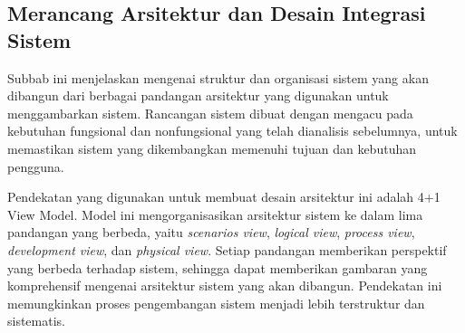 \subsection{Merancang Arsitektur dan Desain Integrasi Sistem}
\label{subsec:merancang-aristektur-dan-desain-integrasi-sistem}

Subbab ini menjelaskan mengenai struktur dan organisasi sistem yang akan dibangun dari berbagai pandangan arsitektur yang digunakan untuk menggambarkan sistem. Rancangan sistem dibuat dengan mengacu pada kebutuhan fungsional dan nonfungsional yang telah 
dianalisis sebelumnya, untuk memastikan sistem yang dikembangkan memenuhi tujuan dan kebutuhan pengguna.

Pendekatan yang digunakan untuk membuat desain arsitektur ini adalah 4+1 View Model. Model ini mengorganisasikan arsitektur sistem ke dalam lima pandangan yang berbeda, yaitu \emph{scenarios view}, \emph{logical view}, \emph{process view}, \emph{development view}, dan \emph{physical view}. Setiap pandangan memberikan perspektif yang berbeda terhadap sistem, sehingga dapat memberikan gambaran yang komprehensif mengenai arsitektur sistem yang akan dibangun. Pendekatan ini memungkinkan proses pengembangan sistem menjadi lebih terstruktur dan sistematis.













